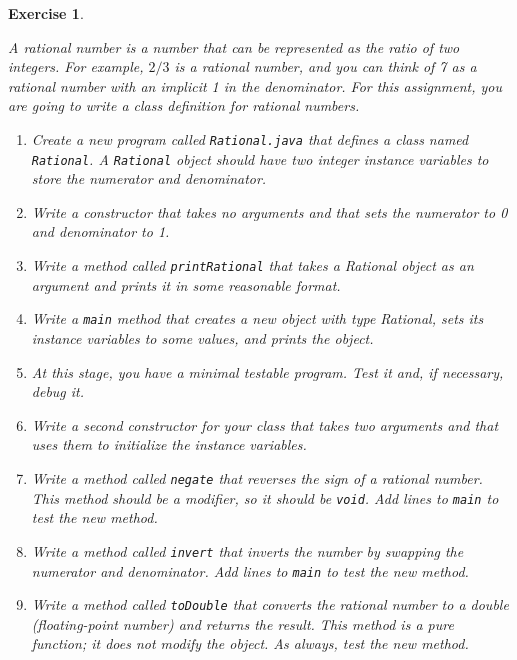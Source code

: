 \documentclass[12pt]{book}
\theoremstyle{exercise}
\newtheorem{exercise}{Exercise}[chapter]
\newcommand{\java}[1]{\lstinline{#1}} %
\begin{document}
\begin{exercise}
\label{ex.rational}

A rational number is a number that can be represented as the ratio of two integers.
For example, $2/3$ is a rational number, and you can think of 7 as a rational number with an implicit 1 in the denominator.
For this assignment, you are going to write a class definition for rational numbers.

\begin{enumerate}

\item Create a new program called \java{Rational.java} that defines a class named \java{Rational}.
A \java{Rational} object should have two integer instance variables to store the numerator and denominator.

\item Write a constructor that takes no arguments and that sets the numerator to 0 and denominator to 1.

\item Write a method called \java{printRational} that takes a Rational object as an argument and prints it in some reasonable format.

\item Write a \java{main} method that creates a new object with type Rational, sets its instance variables to some values, and prints the object.

\item At this stage, you have a minimal testable program.
Test it and, if necessary, debug it.

\item Write a second constructor for your class that takes two arguments and that uses them to initialize the instance variables.

\item Write a method called \java{negate} that reverses the sign of a rational number.
This method should be a modifier, so it should be \java{void}.
Add lines to \java{main} to test the new method.

\item Write a method called \java{invert} that inverts the number by swapping the numerator and denominator.
Add lines to \java{main} to test the new method.

\item Write a method called \java{toDouble} that converts the rational number to a double (floating-point number) and returns the result.
This method is a pure function; it does not modify the object.
As always, test the new method.


\end{enumerate}
\end{exercise}
\end{document}
